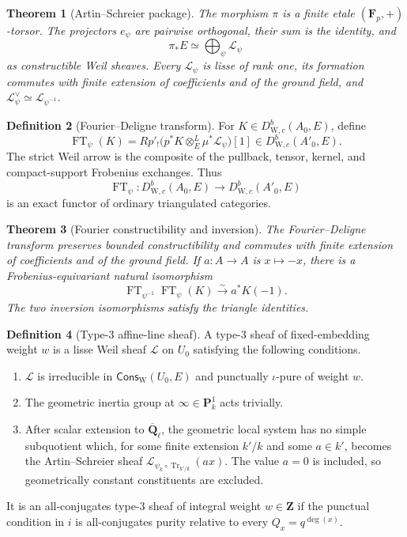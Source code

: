 \documentclass[10pt]{article}
\newtheorem{theorem}{Theorem}[section]
\theoremstyle{definition}
\newtheorem{definition}[theorem]{Definition}
\newcommand{\Qlb}{\overline{\mathbf Q}_\ell}
\newcommand{\WeilD}{D^b_{\mathrm W,c}}
\begin{document}
\begin{theorem}[Artin--Schreier package]
The morphism \(\pi\) is a finite etale
\((\mathbf F_p,+)\)-torsor.  The projectors \(e_\psi\) are pairwise
orthogonal, their sum is the identity, and
\[
                       \pi_*E\simeq\bigoplus_\psi\mathcal L_\psi
\]
as constructible Weil sheaves.  Every \(\mathcal L_\psi\) is lisse of rank
one, its formation commutes with finite extension of coefficients and of
the ground field, and
\(\mathcal L_\psi^\vee\simeq\mathcal L_{\psi^{-1}}\).
\end{theorem}

\begin{definition}[Fourier--Deligne transform]
For \(K\in\WeilD(A_0,E)\), define
\[
 \operatorname{FT}_\psi(K)
   =Rp'_!\bigl(p^*K\otimes_E^L\mu^*\mathcal L_\psi\bigr)[1]
   \in\WeilD(A'_0,E).
\]
The strict Weil arrow is the composite of the pullback, tensor, kernel, and
compact-support Frobenius exchanges.  Thus
\[
 \operatorname{FT}_\psi:\WeilD(A_0,E)\longrightarrow
                              \WeilD(A'_0,E)
\]
is an exact functor of ordinary triangulated categories.
\end{definition}

\begin{theorem}[Fourier constructibility and inversion]
The Fourier--Deligne transform preserves bounded constructibility and
commutes with finite extension of coefficients and of the ground field.  If
\(a:A\to A\) is \(x\mapsto-x\), there is a Frobenius-equivariant natural
isomorphism
\[
 \operatorname{FT}_{\psi^{-1}}\operatorname{FT}_\psi(K)
                    \xrightarrow{\sim}a^*K(-1).
\]
The two inversion isomorphisms satisfy the triangle identities.
\end{theorem}

\begin{definition}[Type-3 affine-line sheaf]
A type-3 sheaf of fixed-embedding weight \(w\) is a lisse Weil sheaf
\(\mathcal L\) on \(U_0\) satisfying the following conditions.
\begin{enumerate}[label=\textup{\(\roman*\)}]
\item \(\mathcal L\) is irreducible in
\(\mathsf{Cons}_{\mathrm W}(U_0,E)\) and punctually
\(\iota\)-pure of weight \(w\).
\item The geometric inertia group at
\(\infty\in\mathbf P^1_k\) acts trivially.
\item After scalar extension to \(\Qlb\), the geometric local system has no
simple subquotient which, for some finite extension \(k'/k\) and some
\(a\in k'\), becomes the Artin--Schreier sheaf
\(\mathcal L_{\psi_k\circ\operatorname{Tr}_{k'/k}}(ax)\).  The value
\(a=0\) is included, so geometrically constant constituents are excluded.
\end{enumerate}
It is an all-conjugates type-3 sheaf of integral weight
\(w\in\mathbf Z\) if the punctual condition in \(i\) is
all-conjugates purity relative to every \(Q_x=q^{\deg(x)}\).
\end{definition}
\end{document}
